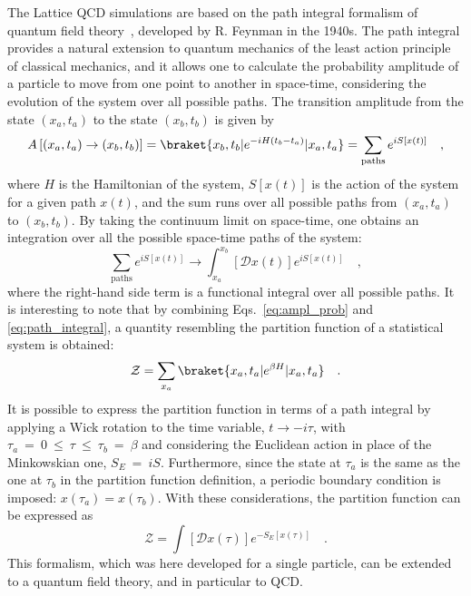 The Lattice QCD simulations are based on the path integral formalism of quantum field theory~\cite{RevModPhys.20.367}, developed by R. Feynman in the 1940s. The path integral provides a natural extension to quantum mechanics of the least action principle of classical mechanics, and it allows one to calculate the probability amplitude of a particle to move from one point to another in space-time, considering the evolution of the system over all possible paths. The transition amplitude from the state $(x_a,t_a)$ to the state $(x_b,t_b)$ is given by
\begin{equation}\label{eq:ampl_prob}
  A \left[(x_a,t_a) \rightarrow (x_b,t_b) \right] = \braket{x_b,t_b | e^{-iH(t_b-t_a)} | x_a,t_a} = \sum_\mathrm{paths} e^{iS[x(t)]}\quad , 
\end{equation}
where $H$ is the Hamiltonian of the system, $S[x(t)]$ is the action of the system for a given path $x(t)$, and the sum runs over all possible paths from $(x_a,t_a)$ to $(x_b,t_b)$. By taking the continuum limit on space-time, one obtains an integration over all the possible space-time paths of the system:
\begin{equation}\label{eq:path_integral}
  \sum_\mathrm{paths} e^{iS[x(t)]} \rightarrow \int_{x_a}^{x_b} \left[\mathcal{D}x(t)\right] e^{iS[x(t)]}\quad ,
\end{equation}
where the right-hand side term is a functional integral over all possible paths. It is interesting to note that by combining Eqs.~\ref{eq:ampl_prob} and \ref{eq:path_integral}, a quantity resembling the partition function of a statistical system is obtained:
\begin{equation*}
  \mathcal{Z} = \sum_{x_a} \braket{x_a,t_a | e^{\beta H} | x_a,t_a}\quad .
\end{equation*}
It is possible to express the partition function in terms of a path integral by applying a Wick rotation to the time variable, $t \rightarrow -i\tau$, with $\tau_a~=~0~\leq~\tau~\leq~\tau_b~=~\beta$ and considering the Euclidean action in place of the Minkowskian one, $S_E~=~iS$. Furthermore, since the state at $\tau_a$ is the same as the one at $\tau_b$ in the partition function definition, a periodic boundary condition is imposed: $x(\tau_a) = x(\tau_b)$. With these considerations, the partition function can be expressed as
\begin{equation*}
  \mathcal{Z} = \int \left[\mathcal{D}x(\tau)\right] e^{-S_E[x(\tau)]}\quad .
\end{equation*}
This formalism, which was here developed for a single particle, can be extended to a quantum field theory, and in particular to QCD.

